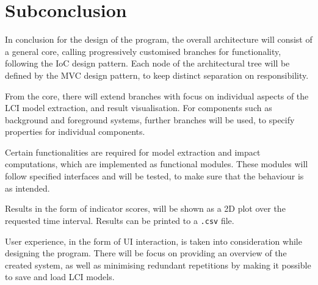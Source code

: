 \section{Subconclusion}\label{sec:Design-Subconclusion}

In conclusion for the design of the program, the overall architecture will consist of a general core, calling progressively customised branches for functionality, following the IoC design pattern. Each node of the architectural tree will be defined by the MVC design pattern, to keep distinct separation on responsibility.

From the core, there will extend branches with focus on individual aspects of the LCI model extraction, and result visualisation. For components such as background and foreground systems, further branches will be used, to specify properties for individual components.

Certain functionalities are required for model extraction and impact computations, which are implemented as functional modules. These modules will follow specified interfaces and will be tested, to make sure that the behaviour is as intended. 

Results in the form of indicator scores, will be shown as a 2D plot over the requested time interval. Results can be printed to a \texttt{.csv} file. 

User experience, in the form of UI interaction, is taken into consideration while designing the program. There will be focus on providing an overview of the created system, as well as minimising redundant repetitions by making it possible to save and load LCI models.